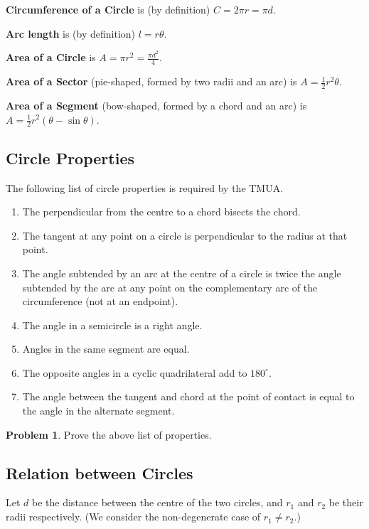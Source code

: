 \documentclass[11pt]{article}
\theoremstyle{definition}
\newtheorem{problem}[theorem]{Problem}
\theoremstyle{remark}
\newcommand{\pqty}[1]{\left(#1\right)}
\newcommand{\flatfrac}[2]{\frac{#1}{#2}}
\newcommand{\degree}{^{\circ}}
\begin{document}
\textbf{Circumference of a Circle} is (by definition) \(C = 2 \pi r = \pi d\).

\textbf{Arc length} is (by definition) \(l = r \theta\).

\textbf{Area of a Circle} is \(A = \pi r^2 = \flatfrac{\pi d^2}{4}\).

\textbf{Area of a Sector} (pie-shaped, formed by two radii and an arc) is \(A = \frac{1}{2} r^2 \theta\).

\textbf{Area of a Segment} (bow-shaped, formed by a chord and an arc) is \(A = \frac{1}{2} r^2 \pqty{\theta - \sin \theta}\).

\subsection{Circle Properties}\label{tmua-3-subsection-005}

The following list of circle properties is required by the TMUA.

\begin{enumerate}
    \item The perpendicular from the centre to a chord bisects the chord.
    \item The tangent at any point on a circle is perpendicular to the radius at that point.
    \item The angle subtended by an arc at the centre of a circle is twice the angle subtended by the arc at any point on the complementary arc of the circumference (not at an endpoint).
    \item The angle in a semicircle is a right angle.
    \item Angles in the same segment are equal.
    \item The opposite angles in a cyclic quadrilateral add to \(180 \degree\).
    \item The angle between the tangent and chord at the point of contact is equal to the angle in the alternate segment.
\end{enumerate}

\begin{problem}\label{tmua-3-unit-009}
    Prove the above list of properties.
\end{problem}

\subsection{Relation between Circles}\label{tmua-3-subsection-006}

Let \(d\) be the distance between the centre of the two circles, and \(r_1\) and \(r_2\) be their radii respectively. (We consider the non-degenerate case of \(r_1 \neq r_2\).)
\end{document}
